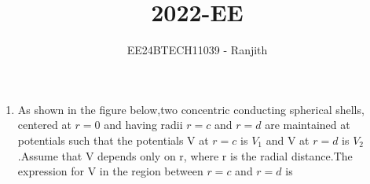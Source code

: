 \documentclass[journal]{IEEEtran}
\begin{document}

\onecolumn
\title{2022-EE}
\author{EE24BTECH11039 - Ranjith}
\maketitle
\begin {enumerate}
\item As shown in the figure below,two concentric conducting spherical shells, centered at $r=0 $ and having radii  $r=c$ and $r=d $ are maintained at potentials such that the potentials V at $r=c$ is $V_1$ and V at $r =d$ is $V_2$.Assume that V depends only on r, where r is the radial distance.The expression for V in the region between $r=c$ and $r=d$ is 

\begin{figure}[h]
\centering
{}%


\end{figure}


\end{enumerate}
\end{document}
